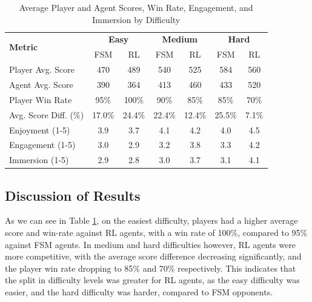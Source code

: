 \documentclass[conference]{IEEEtran}
\begin{document}
\begin{table}[h]
	\centering
	\caption{Average Player and Agent Scores, Win Rate, Engagement, and Immersion by Difficulty}
	\label{tab:results}
	\begin{tabular}{lcccccc}
		\hline
		\multirow{2}{*}{\textbf{Metric}} & \multicolumn{2}{c}{\textbf{Easy}} & \multicolumn{2}{c}{\textbf{Medium}} & \multicolumn{2}{c}{\textbf{Hard}}                           \\
		                                 & FSM                               & RL                                  & FSM                               & RL     & FSM    & RL    \\
		\hline
		Player Avg. Score                & 470                               & 489                                 & 540                               & 525    & 584    & 560   \\
		Agent Avg. Score                 & 390                               & 364                                 & 413                               & 460    & 433    & 520   \\
		Player Win Rate                  & 95\%                              & 100\%                               & 90\%                              & 85\%   & 85\%   & 70\%  \\
		Avg. Score Diff. (\%)            & 17.0\%                            & 24.4\%                              & 22.4\%                            & 12.4\% & 25.5\% & 7.1\% \\
		Enjoyment (1-5)                  & 3.9                               & 3.7                                 & 4.1                               & 4.2    & 4.0    & 4.5   \\
		Engagement (1-5)                 & 3.0                               & 2.9                                 & 3.2                               & 3.8    & 3.3    & 4.2   \\
		Immersion (1-5)                  & 2.9                               & 2.8                                 & 3.0                               & 3.7    & 3.1    & 4.1   \\
		\hline
	\end{tabular}
\end{table}

\subsection{Discussion of Results}

As we can see in Table \ref{tab:results}, on the easiest difficulty, players had a higher average score and win-rate against RL agents, with a win rate of 100\%, compared to 95\% against FSM agents.
In medium and hard difficulties however, RL agents were more competitive, with the average score difference decreasing significantly, and the player win rate dropping to 85\% and 70\% respectively.
This indicates that the split in difficulty levels was greater for RL agents, as the easy difficulty was easier, and the hard difficulty was harder, compared to FSM opponents.
\end{document}
